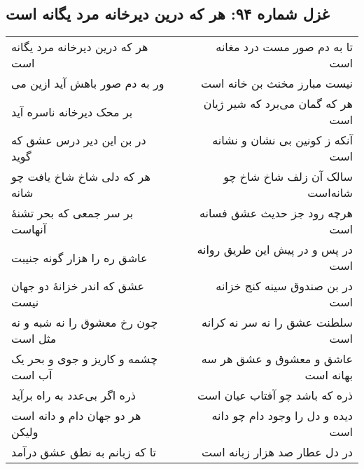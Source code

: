 \begin{center}
\section*{غزل شماره ۹۴: هر که درین دیرخانه مرد یگانه است}
\label{sec:094}
\begin{longtable}{l p{0.5cm} r}
هر که درین دیرخانه مرد یگانه است
&&
تا به دم صور مست درد مغانه است
\\
ور به دم صور باهش آید ازین می
&&
نیست مبارز مخنث بن خانه است
\\
بر محک دیرخانه ناسره آید
&&
هر که گمان می‌برد که شیر ژیان است
\\
در بن این دیر درس عشق که گوید
&&
آنکه ز کونین بی نشان و نشانه است
\\
هر که دلی شاخ شاخ یافت چو شانه
&&
سالک آن زلف شاخ شاخ چو شانه‌است
\\
بر سر جمعی که بحر تشنهٔ آنهاست
&&
هرچه رود جز حدیث عشق فسانه است
\\
عاشق ره را هزار گونه جنیبت
&&
در پس و در پیش این طریق روانه است
\\
عشق که اندر خزانهٔ دو جهان نیست
&&
در بن صندوق سینه کنج خزانه است
\\
چون رخ معشوق را نه شبه و نه مثل است
&&
سلطنت عشق را نه سر نه کرانه است
\\
چشمه و کاریز و جوی و بحر یک آب است
&&
عاشق و معشوق و عشق هر سه بهانه است
\\
ذره اگر بی‌عدد به راه برآید
&&
ذره که باشد چو آفتاب عیان است
\\
هر دو جهان دام و دانه است ولیکن
&&
دیده و دل را وجود دام چو دانه است
\\
تا که زبانم به نطق عشق درآمد
&&
در دل عطار صد هزار زبانه است
\\
\end{longtable}
\end{center}
